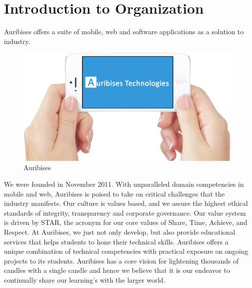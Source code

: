 \section{Introduction to Organization}
Auribises offers a suite of mobile, web and software applications as a solution to industry.
\begin{figure}[ht]
\centering
\includegraphics[scale=0.3]{images/aur.png}
\caption{Auribises}
\end{figure} 
We were founded in November 2011. With unparalleled domain competencies in mobile and web, Auribises is poised to take on critical challenges that the industry manifests. Our culture is values based, and we assure the highest ethical standards of integrity, transparency and corporate governance. Our value system is driven by STAR, the acronym for our core values of Share, Time, Achieve, and Respect. At Auribises, we just not only develop, but also provide educational services that helps students to hone their technical skills. Auribises offers a unique combination of technical competencies with practical exposure on ongoing projects to its students. Auribises has a core vision for lightening thousands of candles with a single candle and hence we believe that it is our endeavor to continually share our learning’s with the larger world.
